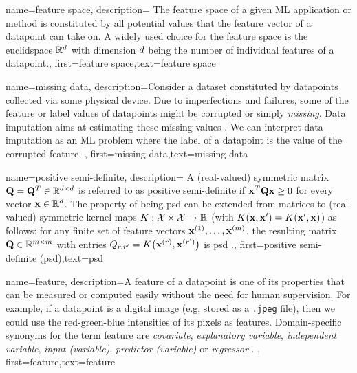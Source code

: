 {name={feature space},
	description={
		The \gls{feature} space of a given ML application or method is 
		constituted by all potential values that the \gls{feature} vector of a \gls{datapoint} can 
		take on. A widely used choice for the feature space is the \gls{euclidspace} $\mathbb{R}^{d}$ 
		with dimension $d$ being the number of individual \gls{feature}s of a \gls{datapoint}.},
	first={feature space},text={feature space}  
}


{name={missing data},
	description={Consider a \gls{dataset} constituted by \gls{datapoint}s collected via 
		some physical device. Due to imperfections and failures, some of the \gls{feature} 
		or \gls{label} values of \gls{datapoint}s might be corrupted or simply \emph{missing}. 
		Data imputation aims at estimating these missing values \cite{Abayomi2008DiagnosticsFM}. 
		We can interpret data imputation as an ML problem where the \gls{label} of a \gls{datapoint} is 
		the value of the corrupted \gls{feature}. },
	first={missing data},text={missing data}  
}


{name={positive semi-definite},
	description=
	{A (real-valued) symmetric matrix $\mathbf{Q} = \mathbf{Q}^{T} \in \mathbb{R}^{d \times d}$ 
	 is referred to as positive semi-definite if ${\bf x}^{T} \mathbf{Q} {\bf x} \geq 0$ for every vector ${\bf x} \in \mathbb{R}^{d}$. 
	 The property of being psd can be extended from matrices to (real-valued) 
	 symmetric \gls{kernel} maps $K: \mathcal{X} \times \mathcal{X} \rightarrow \mathbb{R}$ 
	 (with $K({\bf x},{\bf x}') = K({\bf x}',{\bf x})$)
	 as follows: for any finite set of \gls{feature} vectors ${\bf x}^{(1)},\dots,{\bf x}^{(m)}$, 
	 the resulting matrix $\mathbf{Q} \in \mathbb{R}^{m \times m}$ with 
	entries $Q_{r,r'} = K\big({\bf x}^{(r)},{\bf x}^{(r')}\big)$ 
	is psd \cite{LearningKernelsBook}.},
	first={positive semi-definite (psd)},text={psd}  
}

{name={feature},
	description={A feature of a \gls{datapoint} is one of its properties that can be 
		measured or computed easily without the need for human supervision. For example, if a \gls{datapoint} 
		is a digital image (e.g, stored as a \texttt{.jpeg} file), then we could use the red-green-blue intensities 
		of its pixels as features. Domain-specific synonyms for the term feature are \emph{covariate}, \emph{explanatory variable}, 
		\emph{independent variable}, \emph{input (variable)}, \emph{predictor (variable)} or \emph{regressor} \cite{Gujarati2021,Dodge2003,Everitt2022}. 
		}, first={feature},text={feature}  
}


